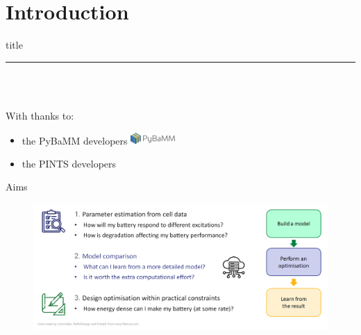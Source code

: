 \documentclass[aspectratio=169]{beamer}
\begin{document}
\section{Introduction}
\begin{frame}[plain]
    \centering
    \begin{beamercolorbox}[sep=8pt,center,shadow=true,rounded=true]{title}
    \insertsectionhead\par%
    \color{oxfordblue}\noindent\rule{10cm}{1pt} \\
    \LARGE{\faBatteryThreeQuarters} \\
    \end{beamercolorbox}
    \vspace{6mm} \normalsize
    \begin{flushleft}
        With thanks to:
    \end{flushleft}
    \begin{itemize}
        \item the PyBaMM developers \href{https://github.com/pybop-team/PyBOP}{\includegraphics[height=1.2em]{Theme/Logos/PyBaMM_logo.png}}
        \item the PINTS developers \href{https://github.com/pints-team/pints}{\faGithub}
    \end{itemize}
\end{frame}


\begin{frame}{Aims}
    \vspace{-6mm}
    \begin{figure}
        \centering
        \includegraphics[width=\textwidth]{Images/Diagrams/ProblemTypes.png}
    \end{figure}
\end{frame}
\end{document}

